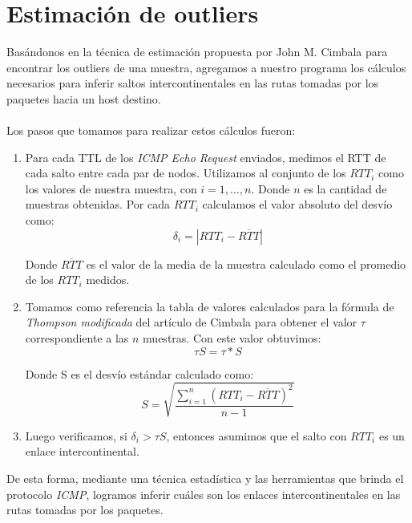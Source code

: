 \section{Estimación de outliers}

Basándonos en la técnica de estimación propuesta por John M. Cimbala para encontrar los outliers de una muestra, agregamos a nuestro programa los cálculos necesarios para inferir saltos intercontinentales en las rutas tomadas por los paquetes hacia un host destino.
\\\\
Los pasos que tomamos para realizar estos cálculos fueron:

\begin{enumerate}
\item 
Para cada TTL de los \emph{ICMP Echo Request} enviados, medimos el RTT de cada salto entre cada par de nodos. Utilizamos al conjunto de los $RTT_i$ como los valores de nuestra muestra, con $i=1,…,n$. Donde $n$ es la cantidad de muestras obtenidas.
Por cada $RTT_i$ calculamos el valor absoluto del desvío como:
\[
\delta_i = |RTT_i - \overline{RTT}|
\]

Donde $\overline{RTT}$ es el valor de la media de la muestra calculado como el promedio de los $RTT_i$ medidos.

\item
Tomamos como referencia la tabla de valores calculados para la fórmula de \emph{Thompson modificada} del artículo de Cimbala para obtener el valor  $\tau$ correspondiente a las $n$ muestras. Con este valor obtuvimos:
\[
\tau S = \tau * S
\]

Donde S es el desvío estándar calculado como:
\[
S=\sqrt{\frac{\sum_{i=1}^{n} (RTT_i - \overline{RTT})^2}{n-1}}
\]

\item
Luego verificamos, si $\delta_i > \tau S$, entonces asumimos que el salto con $RTT_i$ es un enlace intercontinental.
\end{enumerate}

De esta forma, mediante una técnica estadística y las herramientas que brinda el protocolo \emph{ICMP}, logramos inferir cuáles son los enlaces intercontinentales en las rutas tomadas por los paquetes.